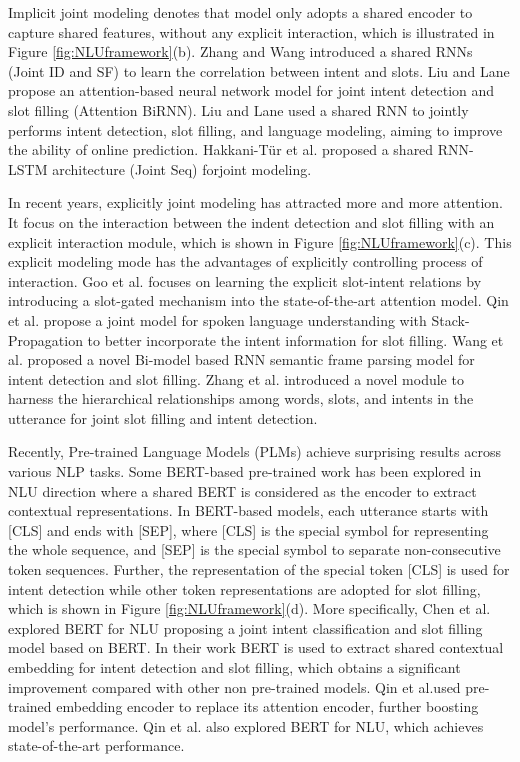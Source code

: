 \documentclass[10pt,twocolumn,letterpaper]{article}
\begin{document}
Implicit joint modeling denotes that model only adopts a shared encoder to capture shared features, without any explicit interaction, which is illustrated in Figure \ref{fig:NLUframework}(b). Zhang and Wang \cite{zhang2016joint} introduced a shared RNNs (Joint ID and SF) to learn the correlation between intent and slots. Liu and Lane\cite{liu2016attention} propose an attention-based
neural network model for joint intent detection and slot filling (Attention BiRNN). Liu and Lane \cite{liu2016joint} used a shared RNN to jointly performs intent detection, slot filling, and language modeling, aiming to improve the ability of online prediction. Hakkani-Tür et al. \cite{hakkani2016multi} proposed a shared RNN-LSTM architecture (Joint Seq) forjoint modeling.

In recent years, explicitly joint modeling has attracted more and more attention. It focus on the interaction between the indent detection and slot filling with an explicit interaction module, which is shown in Figure \ref{fig:NLUframework}(c). This explicit modeling mode has the advantages of explicitly controlling process of interaction. Goo et al.\cite{goo2018slot} focuses on learning the explicit slot-intent relations by introducing a slot-gated mechanism into the state-of-the-art attention model. Qin et al.\cite{qin2019stack}  propose a joint model for spoken language understanding with Stack-Propagation to better incorporate the intent information for slot filling. Wang et al. \cite{wang2018bi} proposed  a novel Bi-model based RNN semantic frame parsing model for intent detection and slot filling. Zhang et al.\cite{zhang2018joint} introduced a novel module to harness the hierarchical relationships among words, slots, and
intents in the utterance for joint slot filling and intent detection.

Recently, Pre-trained Language Models (PLMs) achieve surprising results across various NLP tasks. Some BERT-based\cite{devlin2018bert} pre-trained work has been explored in NLU direction where a shared BERT is considered as the encoder to extract contextual representations. In BERT-based models, each utterance starts with [CLS] and ends with [SEP], where [CLS] is the special symbol for representing the whole sequence, and [SEP] is the special symbol to separate non-consecutive token sequences. Further, the representation of the special token [CLS] is used for intent detection while other token representations are adopted for slot filling, which is shown in Figure \ref{fig:NLUframework}(d). More specifically, Chen et al.\cite{chen2019bert} explored BERT for NLU proposing a joint intent classification and slot filling model based on BERT. In their work BERT is used to extract shared contextual embedding for intent detection and slot filling, which obtains a significant improvement compared with other non pre-trained models. Qin et  al.\cite{qin2019stack}used  pre-trained  embedding encoder to replace its  attention encoder, further boosting model’s performance. Qin et al.\cite{qin2020multi} also explored  BERT for NLU, which achieves state-of-the-art performance. 
\end{document}
